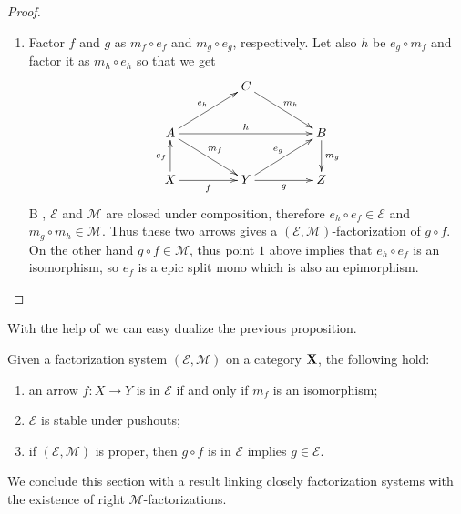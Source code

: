 \documentclass[a4paper,UKenglish,cleveref,pdftex,thm-restate,numberwithinsect]{lipics-v2021}
\def\X{\textbf {\textup{X}}}
\begin{document}
\begin{proof}
\begin{enumerate}
		\item 
		Factor $f$ and $g$ as $m_f\circ e_f$ and $m_g\circ e_g$, respectively. Let also $h$ be $e_g\circ m_f$ and factor it as $m_h\circ e_h$ so that we get 
		\[\xymatrix@C=45pt{& C \ar[dr]^{m_h}&\\
			A\ar[ur]^{e_h} \ar[rr]^{h}  \ar[dr]^{m_f}& &B \ar[d]^{m_g}\\
			X \ar[u]^{e_f} \ar[r]_f& Y \ar[r]_g \ar[ur]^{e_g} & Z}\]
		B , $\mathcal{E}$ and $\mathcal{M}$ are closed under composition, therefore $e_h\circ e_f\in \mathcal{E}$ and $m_g \circ m_h\in \mathcal{M}$. Thus these two arrows gives a $(\mathcal{E}, \mathcal{M})$-factorization of $g\circ f$. On the other hand $g\circ f\in \mathcal{M}$, thus point $1$ above  implies that  $e_h\circ e_f$ is an isomorphism, so $e_f$ is a epic split mono which is also an epimorphism. \qedhere
	\end{enumerate}
\end{proof}

With the help of  we can easy dualize the previous proposition.
\begin{corollary}\label{cor:iso2}
	Given a factorization system $(\mathcal{E}, \mathcal{M})$ on a category $\X$, the following hold:
	\begin{enumerate}
		\item an arrow $f\colon X\to Y$ is in $\mathcal{E}$ if and only if $m_f$ is an isomorphism;
		\item $\mathcal{E}$ is stable under pushouts;
		\item  if $(\mathcal{E}, \mathcal{M})$ is proper, then $g\circ f$ is in $\mathcal{E}$ implies $g\in \mathcal{E}$.
	\end{enumerate}
\end{corollary}

We conclude this section with a result linking closely factorization systems with the existence of right $\mathcal{M}$-factorizations.
\end{document}
